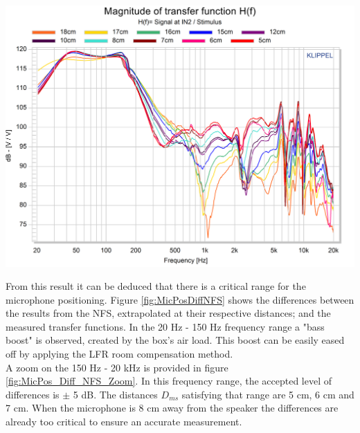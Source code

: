 \documentclass{report}
\begin{document}
\begin{minipage}{0.6\textwidth}
\begin{center}
	\includegraphics[width=1\textwidth]{RoomComp/MicPos_TRF} 
    \captionsetup{hypcap=false} 
	\label{fig:MicPosTRF}
\end{center}
\end{minipage}
\vspace{0.1cm}

From this result it can be deduced that there is a critical range for the microphone positioning. Figure \ref{fig:MicPosDiffNFS} shows the differences between the results from the NFS, extrapolated at their respective distances; and the measured transfer functions. In the 20 Hz - 150 Hz frequency range a "bass boost" is observed, created by the box's air load. This boost can be easily eased off by applying the LFR room compensation method.\\
A zoom on the 150 Hz - 20 kHz is provided in figure \ref{fig:MicPos_Diff_NFS_Zoom}. In this frequency range, the accepted level of differences is $\pm$ 5 dB. The distances $D_{ms}$ satisfying that range are 5 cm, 6 cm and 7 cm. When the microphone is 8 cm away from the speaker the differences are already too critical to ensure an accurate measurement. \\
\end{document}
